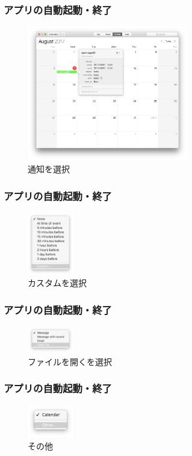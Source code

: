 \documentclass[10pt, dvipdfmx]{beamer}
\begin{document}
        \begin{frame}
            \frametitle{アプリの自動起動・終了}
                \begin{figure}[htb]
                    \includegraphics[width=70mm]{images/app-3.png}
                    \caption{通知を選択}
                    \label{fig:10}
                \end{figure}
        \end{frame}

        \begin{frame}
            \frametitle{アプリの自動起動・終了}
                \begin{figure}[htb]
                    \includegraphics[width=20mm]{images/app-4.png}
                    \caption{カスタムを選択}
                    \label{fig:11}
                \end{figure}
        \end{frame}

        \begin{frame}
            \frametitle{アプリの自動起動・終了}
                \begin{figure}[htb]
                    \includegraphics[width=20mm]{images/app-5.png}
                    \caption{ファイルを開くを選択}
                    \label{fig:12}
                \end{figure}
        \end{frame}

        \begin{frame}
            \frametitle{アプリの自動起動・終了}
                \begin{figure}[htb]
                    \includegraphics[width=20mm]{images/app-6.png}
                    \caption{その他}
                    \label{fig:13}
                \end{figure}
        \end{frame}
\end{document}
